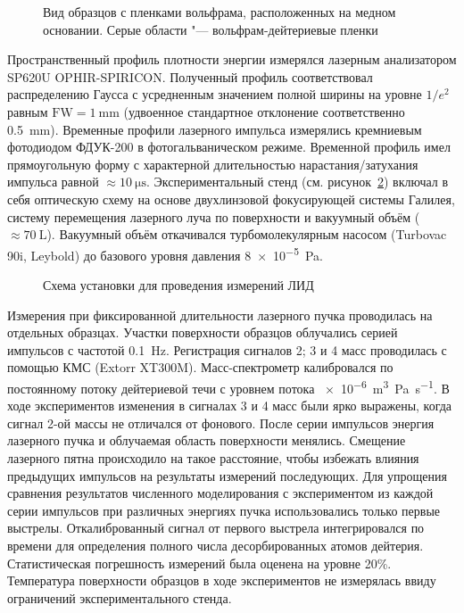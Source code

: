 \begin{figure}[ht]
    \caption{Вид образцов с пленками вольфрама, расположенных на медном основании. Серые области "--- вольфрам-дейтериевые пленки}\label{fig:ch4/LID_target}
\end{figure}

Пространственный профиль плотности энергии измерялся лазерным анализатором SP620U OPHIR-SPIRICON. Полученный профиль соответствовал распределению Гаусса с усредненным значением полной ширины на уровне $1/e^2$ равным \(\mathrm{FW}=\SI{1}{\milli\metre}\) (удвоенное стандартное отклонение соответственно \SI{0.5}{\milli\meter}). Временные профили лазерного импульса измерялись кремниевым фотодиодом ФДУК-200 в фотогальваническом режиме. Временной профиль имел прямоугольную форму с характерной длительностью нарастания/затухания импульса равной \( \approx \SI{10}{\micro\second} \). Экспериментальный стенд (см. рисунок~\ref{fig:ch4/LID_scheme}) включал в себя оптическую схему на основе двухлинзовой фокусирующей системы Галилея, систему перемещения лазерного луча по поверхности и вакуумный объём ($\approx\SI{70}{\liter}$). Вакуумный объём откачивался турбомолекулярным насосом (Turbovac 90i, Leybold) до базового уровня давления \SI{8e-5}{\pascal}.

\begin{figure}[ht]
    \caption{Схема установки для проведения измерений ЛИД~\cite{Medvedev2024}}\label{fig:ch4/LID_scheme}
\end{figure}

Измерения при фиксированной длительности лазерного пучка проводилась на отдельных образцах. Участки поверхности образцов облучались серией импульсов с частотой \SI{0.1}{\hertz}. Регистрация сигналов 2; 3 и 4 масс проводилась с помощью КМС (Extorr XT300M). Масс-спектрометр калибровался по постоянному потоку дейтериевой течи с уровнем потока \SI{e-6}{\metre\cubed\pascal\per\second}. В ходе экспериментов изменения в сигналах 3 и 4 масс были ярко выражены, когда сигнал 2-ой массы не отличался от фонового. После серии импульсов энергия лазерного пучка и облучаемая область поверхности менялись. Смещение лазерного пятна происходило на такое расстояние, чтобы избежать влияния предыдущих импульсов на результаты измерений последующих. Для упрощения сравнения результатов численного моделирования с экспериментом из каждой серии импульсов при различных энергиях пучка использовались только первые выстрелы. Откалиброванный сигнал от первого выстрела интегрировался по времени для определения полного числа десорбированных атомов дейтерия. Статистическая погрешность измерений была оценена на уровне 20\%. Температура поверхности образцов в ходе экспериментов не измерялась ввиду ограничений экспериментального стенда.

